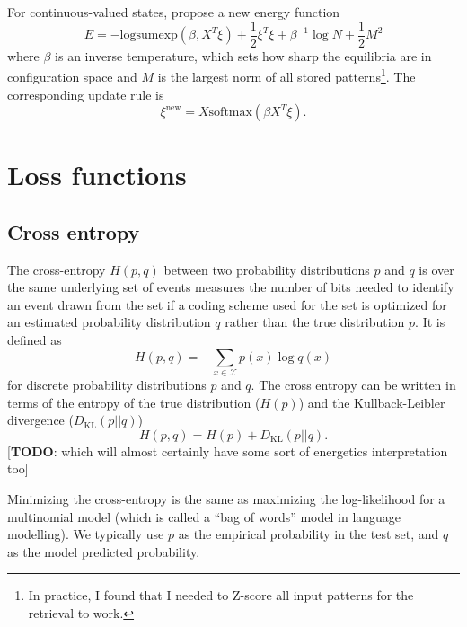 \documentclass[11pt]{article}
\numberwithin{equation}{section}
\begin{document}
For continuous-valued states, \citep{Ramsauer20} propose a new energy function
\begin{equation}
E = -\text{logsumexp}(\beta, X^T \xi) + \frac{1}{2} \xi^T \xi + \beta^{-1} \log N + \frac{1}{2} M^2
\end{equation}
where $\beta$ is an inverse temperature, which sets how sharp the equilibria are in configuration space and $M$ is the largest norm of all stored patterns\footnote{In practice, I found that I needed to Z-score all input patterns for the retrieval to work.}. The corresponding update rule is
\begin{equation}
\xi^{\text{new}} = X \text{softmax}(\beta X^T \xi).
\end{equation}


\section{Loss functions}

\subsection{Cross entropy}
The cross-entropy $H(p,q)$ between two probability distributions $p$ and $q$ is over the same underlying set of events measures the number of bits needed to identify an event drawn from the set if a coding scheme used for the set is optimized for an estimated probability distribution $q$ rather than the true distribution $p$. It is defined as 
\begin{equation}
H(p,q) = - \sum_{x \in \mathcal{X}} p(x) \log q(x)
\end{equation}
for discrete probability distributions $p$ and $q$. The cross entropy can be written in terms of the entropy of the true distribution ($H(p)$) and the Kullback-Leibler divergence ($D_{\text{KL}}(p||q)$)
\begin{equation}
H(p,q) = H(p) + D_{\text{KL}}(p||q).
\end{equation}
[\textbf{TODO}: which will almost certainly have some sort of energetics interpretation too] 

Minimizing the cross-entropy is the same as maximizing the log-likelihood for a multinomial model (which is called a ``bag of words'' model in language modelling). We typically use $p$ as the empirical probability in the test set, and $q$ as the model predicted probability.
\end{document}
